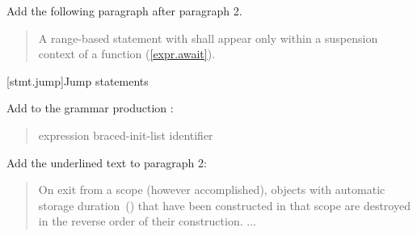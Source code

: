 Add the following paragraph after paragraph 2.

\begin{quote}
	\setcounter{Paras}{2}
	\pnum
	A range-based  statement with  shall appear only within a suspension context of a function (\ref{expr.await}).
\end{quote}
%
%
%
%
%
%
%

\setcounter{section}{5}
[stmt.jump]{Jump statements}%

Add  to the grammar production :

\begin{quote}
  \begin{bnf}
    \br
    \br
    \br
     expression\opt \terminal{;}\br
     braced-init-list \terminal{;}\br
     \br
     identifier \terminal{;}
  \end{bnf}
\end{quote}

Add the underlined text to paragraph 2:

\begin{quote}
\setcounter{Paras}{1}
\pnum
On exit from a scope (however accomplished), objects with automatic storage
duration~() that have been constructed in that scope are destroyed
in the reverse order of their construction.
...
\end{quote}

